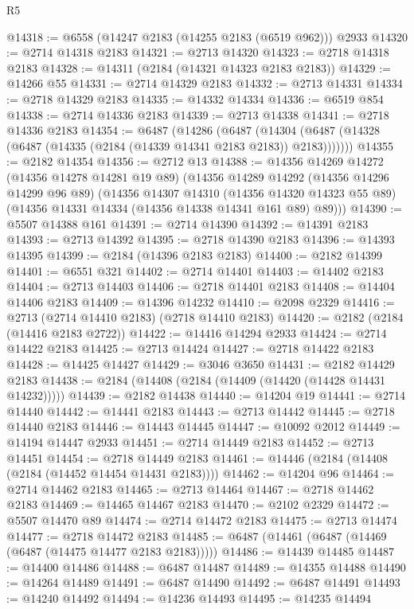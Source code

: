 \begin{lexlean}{R5}
\begin{coremodule}
@14318 := @6558 (@14247 @2183 (@14255 @2183 (@6519 @962))) @2933
@14320 := @2714 @14318 @2183
@14321 := @2713 @14320
@14323 := @2718 @14318 @2183
@14328 := @14311 (@2184 (@14321 @14323 @2183 @2183))
@14329 := @14266 @55
@14331 := @2714 @14329 @2183
@14332 := @2713 @14331
@14334 := @2718 @14329 @2183
@14335 := @14332 @14334
@14336 := @6519 @854
@14338 := @2714 @14336 @2183
@14339 := @2713 @14338
@14341 := @2718 @14336 @2183
@14354 := @6487
    (@14286
      (@6487 (@14304 (@6487 (@14328 (@6487 (@14335 (@2184 (@14339 @14341 @2183 @2183)) @2183)))))))
@14355 := @2182 @14354
@14356 := @2712 @13
@14388 := @14356
    @14269
    @14272
    (@14356 @14278 @14281 @19 @89)
    (@14356
      @14289
      @14292
      (@14356 @14296 @14299 @96 @89)
      (@14356
        @14307
        @14310
        (@14356 @14320 @14323 @55 @89)
        (@14356 @14331 @14334 (@14356 @14338 @14341 @161 @89) @89)))
@14390 := @5507 @14388 @161
@14391 := @2714 @14390
@14392 := @14391 @2183
@14393 := @2713 @14392
@14395 := @2718 @14390 @2183
@14396 := @14393 @14395
@14399 := @2184 (@14396 @2183 @2183)
@14400 := @2182 @14399
@14401 := @6551 @321
@14402 := @2714 @14401
@14403 := @14402 @2183
@14404 := @2713 @14403
@14406 := @2718 @14401 @2183
@14408 := @14404 @14406 @2183
@14409 := @14396 @14232
@14410 := @2098 @2329
@14416 := @2713 (@2714 @14410 @2183) (@2718 @14410 @2183)
@14420 := @2182 (@2184 (@14416 @2183 @2722))
@14422 := @14416 @14294 @2933
@14424 := @2714 @14422 @2183
@14425 := @2713 @14424
@14427 := @2718 @14422 @2183
@14428 := @14425 @14427
@14429 := @3046 @3650
@14431 := @2182 @14429 @2183
@14438 := @2184 (@14408 (@2184 (@14409 (@14420 (@14428 @14431 @14232)))))
@14439 := @2182 @14438
@14440 := @14204 @19
@14441 := @2714 @14440
@14442 := @14441 @2183
@14443 := @2713 @14442
@14445 := @2718 @14440 @2183
@14446 := @14443 @14445
@14447 := @10092 @2012
@14449 := @14194 @14447 @2933
@14451 := @2714 @14449 @2183
@14452 := @2713 @14451
@14454 := @2718 @14449 @2183
@14461 := @14446 (@2184 (@14408 (@2184 (@14452 @14454 @14431 @2183))))
@14462 := @14204 @96
@14464 := @2714 @14462 @2183
@14465 := @2713 @14464
@14467 := @2718 @14462 @2183
@14469 := @14465 @14467 @2183
@14470 := @2102 @2329
@14472 := @5507 @14470 @89
@14474 := @2714 @14472 @2183
@14475 := @2713 @14474
@14477 := @2718 @14472 @2183
@14485 := @6487 (@14461 (@6487 (@14469 (@6487 (@14475 @14477 @2183 @2183)))))
@14486 := @14439 @14485
@14487 := @14400 @14486
@14488 := @6487 @14487
@14489 := @14355 @14488
@14490 := @14264 @14489
@14491 := @6487 @14490
@14492 := @6487 @14491
@14493 := @14240 @14492
@14494 := @14236 @14493
@14495 := @14235 @14494

\end{coremodule}
\end{lexlean}
